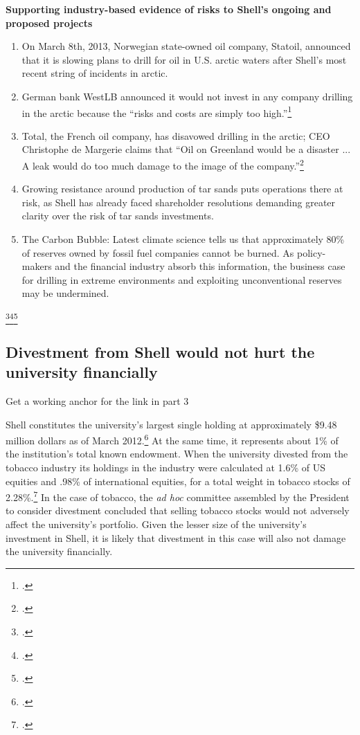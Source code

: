 \textbf{Supporting industry-based evidence of risks to Shell's ongoing and proposed projects}



\begin{enumerate}
	\item On March 8th, 2013, Norwegian state-owned oil company, Statoil, announced that it is slowing plans to drill for oil in U.S. arctic waters after Shell's most recent string of incidents in arctic.
	\item German bank WestLB announced it would not invest in any company drilling in the arctic because the ``risks and costs are simply too high.''\footcite[][]{Naidoo_2012}
	\item Total, the French oil company, has disavowed drilling in the arctic; CEO Christophe de Margerie claims that ``Oil on Greenland would be a disaster ... A leak would do too much damage to the image of the company.''\footcite[][]{NewsWire_2012}
	\item Growing resistance around production of tar sands puts operations there at risk, as Shell has already faced shareholder resolutions demanding greater clarity over the risk of tar sands investments.
	\item The Carbon Bubble: Latest climate science tells us that approximately 80\% of reserves owned by fossil fuel companies cannot be burned. As policy-makers and the financial industry absorb this information, the business case for drilling in extreme environments and exploiting unconventional reserves may be undermined.
\end{enumerate}\footcite[][]{carbontracker}\footcite[][]{UNEP_2009}\footcite[][]{HSBC_2013}


	\subsection{Divestment from Shell would not hurt the university financially}

\begin{vcom}
		Get a working anchor for the link in part 3
\end{vcom}


Shell constitutes the university's largest single holding at approximately \$9.48 million dollars as of March 2012.\footcite[][]{UTAM_2012}  
At the same time, it represents about 1\% of the institution's total known endowment.
When the university divested from the tobacco industry its holdings in the industry were calculated at 1.6\% of US equities and .98\% of international equities, for a total weight in tobacco stocks of 2.28\%.\footcite[][]{TobaccoReport_2007}
In the case of tobacco, the \emph{ad hoc} committee assembled by the President to consider divestment concluded that selling tobacco stocks  would not adversely affect the university's portfolio. 
Given the lesser size of the university's investment in Shell, it is likely that divestment in this case will also not damage the university financially.



